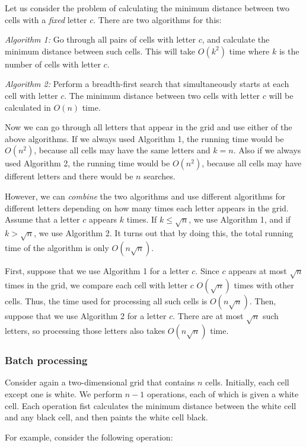 Let us consider the problem of calculating the minimum distance
between two cells with a \emph{fixed} letter $c$.
There are two algorithms for this:

\emph{Algorithm 1:} Go through all pairs of cells with letter $c$,
and calculate the minimum distance between such cells.
This will take $O(k^2)$ time where $k$ is the number of cells with letter $c$.

\emph{Algorithm 2:} Perform a breadth-first search that simultaneously
starts at each cell with letter $c$. The minimum distance between
two cells with letter $c$ will be calculated in $O(n)$ time.

Now we can go through all letters that appear in the grid
and use either of the above algorithms.
If we always used Algorithm 1, the running time would be $O(n^2)$,
because all cells may have the same letters and $k=n$.
Also if we always used Algorithm 2, the running time would be $O(n^2)$,
because all cells may have different letters and there would
be $n$ searches.

However, we can \emph{combine} the two algorithms and
use different algorithms for different letters
depending on how many times each letter appears in the grid.
Assume that a letter $c$ appears $k$ times.
If $k \le \sqrt n$, we use Algorithm 1, and if $k > \sqrt n$,
we use Algorithm 2.
It turns out that by doing this, the total running time
of the algorithm is only $O(n \sqrt n)$.

First, suppose that we use Algorithm 1 for a letter $c$.
Since $c$ appears at most $\sqrt n$ times in the grid,
we compare each cell with letter $c$ $O(\sqrt n)$ times
with other cells.
Thus, the time used for processing all such cells is $O(n \sqrt n)$.
Then, suppose that we use Algorithm 2 for a letter $c$.
There are at most $\sqrt n$ such letters,
so processing those letters also takes $O(n \sqrt n)$ time.

\subsubsection{Batch processing}

Consider again a two-dimensional grid that contains $n$ cells.
Initially, each cell except one is white.
We perform $n-1$ operations, each of which is given a white cell.
Each operation fist calculates the minimum distance
between the white cell and any black cell, and
then paints the white cell black.

For example, consider the following operation:

